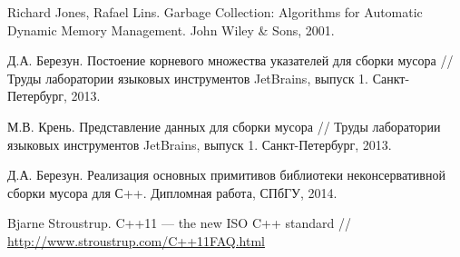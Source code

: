 
\begin{thebibliography}{}

Richard Jones, Rafael Lins. Garbage Collection: Algorithms for Automatic Dynamic Memory Management. John Wiley \& Sons, 2001.

Д.А. Березун. Постоение корневого множества указателей для сборки мусора // Труды лаборатории языковых инструментов JetBrains, 
выпуск 1. Санкт-Петербург, 2013.

М.В. Крень. Представление данных для сборки мусора // Труды лаборатории языковых инструментов JetBrains, выпуск 1. Санкт-Петербург, 2013.


Д.А. Березун. Реализация основных примитивов библиотеки неконсервативной сборки мусора для С++. Дипломная работа, СПбГУ, 2014.


Bjarne Stroustrup. C++11 --- the new ISO C++ standard // \url{http://www.stroustrup.com/C++11FAQ.html}


\end{thebibliography}
